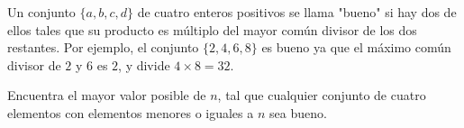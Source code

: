 Un conjunto $\{a, b, c, d\}$ de cuatro enteros positivos se llama "bueno" si hay dos de ellos tales que su producto es múltiplo del mayor común divisor de los dos restantes. Por ejemplo, el conjunto $\{2, 4, 6, 8\}$ es bueno ya que el máximo común divisor de $2$ y $6$ es $2$, y divide $4\times 8=32$.

Encuentra el mayor valor posible de $n$, tal que cualquier conjunto de cuatro elementos con elementos menores o iguales a $n$ sea bueno.
